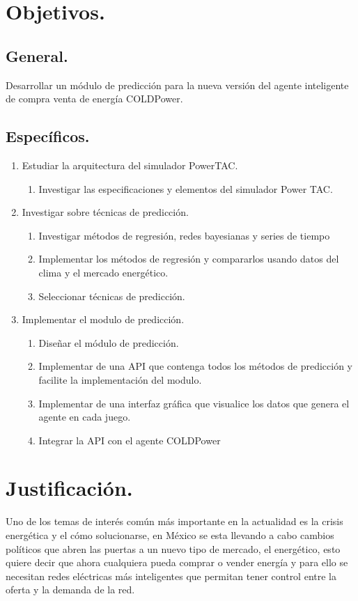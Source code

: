 \section{Objetivos.}
\subsection{General.}
Desarrollar un módulo de predicción para la nueva versión del agente inteligente de compra venta de energía COLDPower.
\subsection{Específicos.}
\renewcommand{\labelenumi}{$\bullet$ }
\renewcommand{\labelenumii}{\alph{enumii})}
\begin{enumerate}
    \item Estudiar la arquitectura del simulador PowerTAC. 
    \begin{enumerate}
        \item Investigar las especificaciones y elementos del simulador Power TAC.
    \end{enumerate} 
    \item Investigar sobre técnicas de predicción.
    \begin{enumerate}
        \item Investigar métodos de regresión, redes bayesianas y series de tiempo
		\item Implementar los métodos de regresión y compararlos usando datos del clima y el mercado energético.
		\item Seleccionar técnicas de predicción.
    \end{enumerate}
    \item Implementar el modulo de predicción.
        \begin{enumerate}
        \item Diseñar el módulo de predicción.
		\item Implementar de una API que contenga todos los métodos de predicción y facilite la implementación del modulo.
		\item Implementar de una interfaz gráfica que visualice los datos que genera el agente en cada juego.
		\item Integrar la API con el agente COLDPower
    \end{enumerate}
\end{enumerate}

\section{Justificación.}
Uno de los temas de interés común más importante en la actualidad es la crisis energética y el cómo solucionarse, en México se esta llevando a cabo cambios políticos que abren las puertas a un nuevo tipo de mercado, el energético, esto quiere decir que ahora cualquiera pueda comprar o vender energía y para ello se necesitan redes eléctricas más inteligentes que permitan tener control entre la oferta y la demanda de la red.
\\


